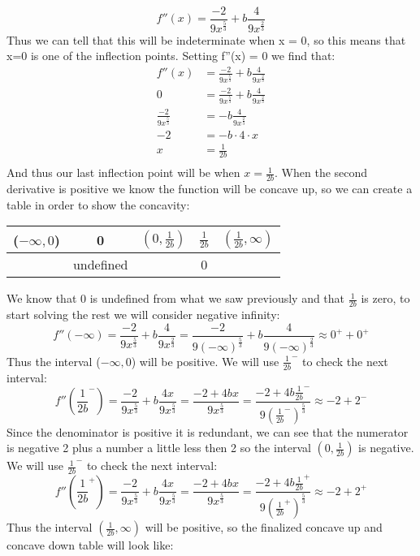 \documentclass[11pt]{article}
\begin{document}
\[ f''(x)  = \frac{-2}{9x^{\frac{5}{3}}} + b\frac{4}{9x^{\frac{2}{3}}}\]
Thus we can tell that this will be indeterminate when x = 0, so this means that x=0 is one of the inflection points. Setting f''(x) = 0 we find that:
\begin{align*}
f''(x) & = \frac{-2}{9x^{\frac{5}{3}}} + b\frac{4}{9x^{\frac{2}{3}}} \\
0 & = \frac{-2}{9x^{\frac{5}{3}}} + b\frac{4}{9x^{\frac{2}{3}}} \\
 \frac{-2}{9x^{\frac{5}{3}}}  & = -b\frac{4}{9x^{\frac{2}{3}}} \\
-2  & = -b\cdot4\cdot x \\
x &= \frac{1}{2b} \\
\end{align*}
And thus our last inflection point will be when $x = \frac{1}{2b}$. When the second derivative is positive we know the function will be concave up, so we can create a table in order to show the concavity:
\begin{center}
 \begin{tabular}{||c c c c c||} 
 \hline
 ($-\infty, 0$) & 0 & $(0, \frac{1}{2b})$ &  $\frac{1}{2b}$ & $( \frac{1}{2b},\infty)$  \\ [0.5ex] 
 \hline\hline
&  undefined &  & 0 &\\ 
 \hline
\end{tabular}
\end{center}
We know that 0 is undefined from what we saw previously and that $\frac{1}{2b}$ is zero, to start solving the rest we will consider negative infinity:
\[ f''(-\infty) = \frac{-2}{9x^{\frac{5}{3}}} + b\frac{4}{9x^{\frac{2}{3}}} = \frac{-2}{9(-\infty)^{\frac{5}{3}}} + b\frac{4}{9(-\infty)^{\frac{2}{3}}} \approx 0^+ + 0^+\]
Thus the interval  ($-\infty, 0$) will be positive. We will use $\frac{1}{2b}^-$ to check the next interval:
\[ f''(\frac{1}{2b}^-) = \frac{-2}{9x^{\frac{5}{3}}} + b\frac{4x}{9x^{\frac{5}{3}}} = \frac{-2+4bx}{9x^{\frac{5}{3}}} =   \frac{-2+4b\frac{1}{2b}^-}{9(\frac{1}{2b}^-)^{\frac{5}{3}}} \approx -2 + 2^-\]
Since the denominator is positive it is redundant, we can see that the numerator is negative 2 plus a number a little less then 2 so the interval $(0, \frac{1}{2b})$ is negative. We will use $\frac{1}{2b}^-$ to check the next interval:
\[ f''(\frac{1}{2b}^+) = \frac{-2}{9x^{\frac{5}{3}}} + b\frac{4x}{9x^{\frac{5}{3}}} = \frac{-2+4bx}{9x^{\frac{5}{3}}} =   \frac{-2+4b\frac{1}{2b}^+}{9(\frac{1}{2b}^+)^{\frac{5}{3}}} \approx -2 + 2^+\]
Thus the interval $(\frac{1}{2b},\infty)$ will be positive, so the finalized concave up and concave down table will look like:
\end{document}
